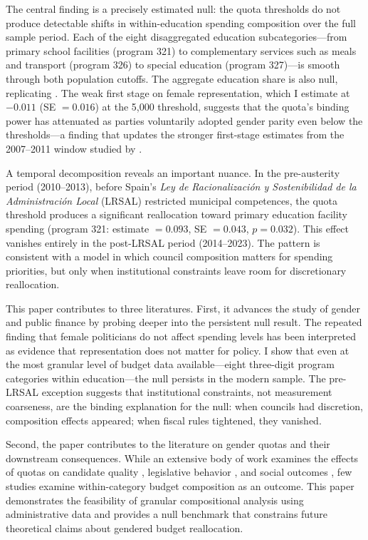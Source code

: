 \documentclass[12pt]{article}
\begin{document}
The central finding is a precisely estimated null: the quota thresholds do not produce detectable shifts in within-education spending composition over the full sample period. Each of the eight disaggregated education subcategories---from primary school facilities (program 321) to complementary services such as meals and transport (program 326) to special education (program 327)---is smooth through both population cutoffs. The aggregate education share is also null, replicating \citet{bagues2021can}. The weak first stage on female representation, which I estimate at $-0.011$ (SE $= 0.016$) at the 5,000 threshold, suggests that the quota's binding power has attenuated as parties voluntarily adopted gender parity even below the thresholds---a finding that updates the stronger first-stage estimates from the 2007--2011 window studied by \citet{bagues2021can}.

A temporal decomposition reveals an important nuance. In the pre-austerity period (2010--2013), before Spain's \emph{Ley de Racionalizaci\'{o}n y Sostenibilidad de la Administraci\'{o}n Local} (LRSAL) restricted municipal competences, the quota threshold produces a significant reallocation toward primary education facility spending (program 321: estimate $= 0.093$, SE $= 0.043$, $p = 0.032$). This effect vanishes entirely in the post-LRSAL period (2014--2023). The pattern is consistent with a model in which council composition matters for spending priorities, but only when institutional constraints leave room for discretionary reallocation.

This paper contributes to three literatures. First, it advances the study of gender and public finance by probing deeper into the persistent null result. The repeated finding that female politicians do not affect spending levels \citep{ferreira2014does, bagues2021can} has been interpreted as evidence that representation does not matter for policy. I show that even at the most granular level of budget data available---eight three-digit program categories within education---the null persists in the modern sample. The pre-LRSAL exception suggests that institutional constraints, not measurement coarseness, are the binding explanation for the null: when councils had discretion, composition effects appeared; when fiscal rules tightened, they vanished.

Second, the paper contributes to the literature on gender quotas and their downstream consequences. While an extensive body of work examines the effects of quotas on candidate quality \citep{baltrunaite2014quotas, besley2017gender, casas2018quotas}, legislative behavior \citep{washington2008female, lippmann2022gender}, and social outcomes \citep{bhalotra2014health, iyer2012female, brollo2016does}, few studies examine within-category budget composition as an outcome. This paper demonstrates the feasibility of granular compositional analysis using administrative data and provides a null benchmark that constrains future theoretical claims about gendered budget reallocation.
\end{document}
